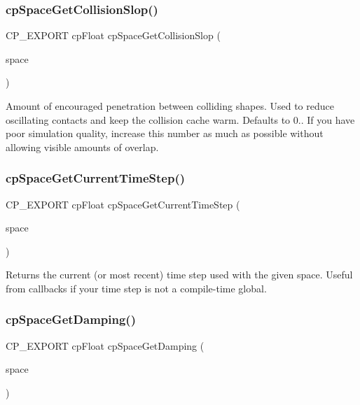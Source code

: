 \subsubsection{\texorpdfstring{cp\+Space\+Get\+Collision\+Slop()}{cpSpaceGetCollisionSlop()}}
{\footnotesize\ttfamily C\+P\+\_\+\+E\+X\+P\+O\+RT cp\+Float cp\+Space\+Get\+Collision\+Slop (\begin{DoxyParamCaption}\item[{const \hyperlink{structcpSpace}{cp\+Space} $\ast$}]{space }\end{DoxyParamCaption})}

Amount of encouraged penetration between colliding shapes. Used to reduce oscillating contacts and keep the collision cache warm. Defaults to 0.. If you have poor simulation quality, increase this number as much as possible without allowing visible amounts of overlap. \mbox{\label{group__cpSpace_gad4819cd09e4590b60eea6b6dc8b4cf80}} 
\subsubsection{\texorpdfstring{cp\+Space\+Get\+Current\+Time\+Step()}{cpSpaceGetCurrentTimeStep()}}
{\footnotesize\ttfamily C\+P\+\_\+\+E\+X\+P\+O\+RT cp\+Float cp\+Space\+Get\+Current\+Time\+Step (\begin{DoxyParamCaption}\item[{const \hyperlink{structcpSpace}{cp\+Space} $\ast$}]{space }\end{DoxyParamCaption})}

Returns the current (or most recent) time step used with the given space. Useful from callbacks if your time step is not a compile-\/time global. \mbox{\label{group__cpSpace_gac00ad0e4956e444fa23874fae68df3b7}} 
\subsubsection{\texorpdfstring{cp\+Space\+Get\+Damping()}{cpSpaceGetDamping()}}
{\footnotesize\ttfamily C\+P\+\_\+\+E\+X\+P\+O\+RT cp\+Float cp\+Space\+Get\+Damping (\begin{DoxyParamCaption}\item[{const \hyperlink{structcpSpace}{cp\+Space} $\ast$}]{space }\end{DoxyParamCaption})}

